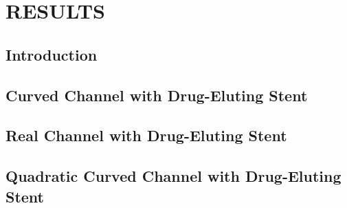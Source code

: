 \chapter{\textbf{RESULTS}}
\label{resultados}

\section{\textbf{Introduction}} 


%

\section{\textbf{Curved Channel with Drug-Eluting Stent}} 
\label{canal curvado com stent}


%

\section{\textbf{Real Channel with Drug-Eluting Stent}} 
\label{canal real com stent}


\section{\textbf{Quadratic Curved Channel with Drug-Eluting Stent}} 
\label{quad canal curvado com stent}





%

